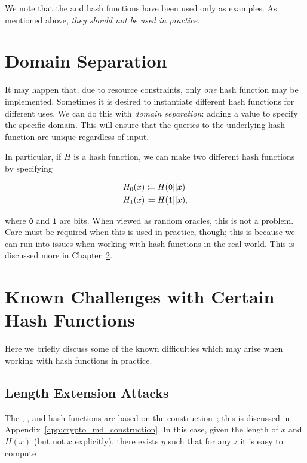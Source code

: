 We note that the \MDFive{} and \ShaOne{} \glspl{hash function} have been
used only as examples.
As mentioned above, \emph{they should not be used in practice.}



\section{Domain Separation}

It may happen that, due to resource constraints, only \emph{one}
\gls{hash function} may be implemented.
Sometimes it is desired to instantiate different \glspl{hash function}
for different uses.
We can do this with \emph{domain separation}:
adding a value to specify the specific domain.
This will ensure that the queries to the underlying \gls{hash function}
are unique regardless of input.

In particular, if $H$ is a \gls{hash function}, we can make two different
\glspl{hash function} by specifying

\begin{align}
    H_{0}(x) &\coloneqq{} H(\texttt{0}||x) \nonumber\\
    H_{1}(x) &\coloneqq{} H(\texttt{1}||x),
\end{align}

\noindent
where $\texttt{0}$ and $\texttt{1}$ are bits.
When viewed as \glspl{random oracle}, this is not a problem.
Care must be required when this is used in practice, though;
this is because we can run into issues when working with
\glspl{hash function} in the real world.
This is discussed more in Chapter~\ref{sec:hash_challenges}.



\section{Known Challenges with Certain Hash Functions}
\label{sec:hash_challenges}

Here we briefly discuss some of the known difficulties which may arise when
working with \glspl{hash function} in practice.

\subsection{Length Extension Attacks}
\label{ssec:hash_challenges_length_extension}

The \MDFive{}, \ShaOne{}, and \ShaTwo{} \glspl{hash function} are based
on the \MD{}
construction~\cite{merkle1979secrecy,damgaard1989design};
this is discussed in Appendix~\ref{app:crypto_md_construction}.
In this case, given the length of $x$ and $H(x)$ (but not $x$ explicitly),
there exists $y$ such that for any $z$
it is easy to compute

